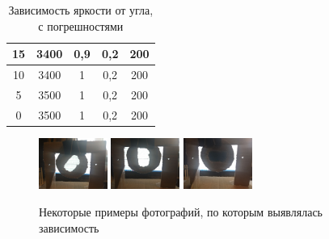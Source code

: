 \documentclass[a4paper, 12pt]{article}%
\begin{document}
\begin{enumerate}
\begin{table}[h]
\begin{center}
\begin{tabular}{|c|c|c|c|c|}
15        & 3400          & 0,9             & 0,2                     & 200              \\ \hline
10        & 3400          & 1               & 0,2                     & 200              \\ \hline
5         & 3500          & 1               & 0,2                     & 200              \\ \hline
0         & 3500          & 1               & 0,2                     & 200              \\ \hline
\end{tabular}
\caption{Зависимость яркости от угла, с погрешностями}
\end{center}
\end{table}

\begin{figure}[h]
\begin{center}
\includegraphics[width = 0.2\textwidth]{2.jpg}
\includegraphics[width = 0.2\textwidth]{3.jpg}
\includegraphics[width = 0.2\textwidth]{4.jpg}
\caption{Некоторые примеры фотографий, по которым выявлялась зависимость}

\end{center}
\end{figure}


\end{enumerate}
\end{document}

